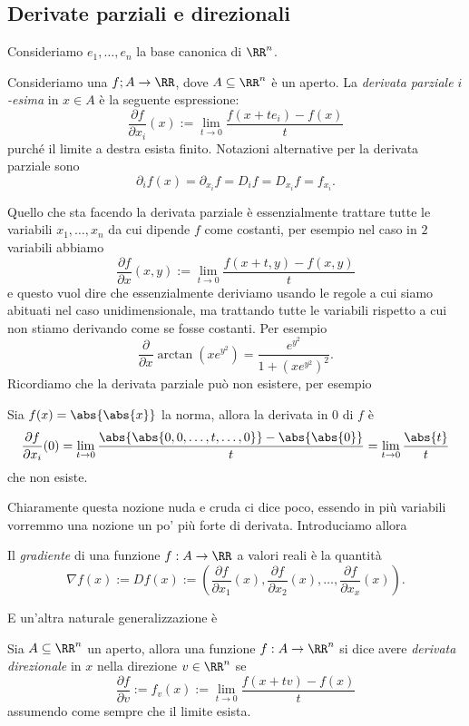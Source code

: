 \documentclass[11pt]{scrartcl}
\begin{document}
	\subsection{Derivate parziali e direzionali}
	Consideriamo $e_1,\dots,e_n$ la base canonica di $\RR^n$.
	\begin{definition}
		Consideriamo una $f;A\to \RR$, dove $A\subseteq \RR^n$ è un aperto. La \textit{derivata parziale $i$-esima} in $x\in A$ è la seguente espressione:
		$$\frac{\partial f}{\partial x_i}(x):=\lim_{t\to 0}\frac{f(x+te_i)-f(x)}{t}$$
		purché il limite a destra esista finito. Notazioni alternative per la derivata parziale sono
		$$\partial_if(x)=\partial_{x_i}f=D_if=D_{x_i}f=f_{x_i}.$$
	\end{definition}
	Quello che sta facendo la derivata parziale è essenzialmente trattare tutte le variabili $x_1,\dots,x_n$ da cui dipende $f$ come costanti, per esempio nel caso in $2$ variabili abbiamo
	$$\frac{\partial f}{\partial x}(x,y):=\lim_{t\to 0}\frac{f(x+t,y)-f(x,y)}{t}$$
	e questo vuol dire che essenzialmente deriviamo usando le regole a cui siamo abituati nel caso unidimensionale, ma trattando tutte le variabili rispetto a cui non stiamo derivando come se fosse costanti. Per esempio
	$$\frac{\partial}{\partial x}\arctan(x e^{y^2})=\frac{e^{y^2}}{1+(xe^{y^2})^2}.$$
	Ricordiamo che la derivata parziale può non esistere, per esempio
	\begin{example}
		Sia $f(x)=\abs{\abs{x}}$ la norma, allora la derivata in $0$ di $f$ è
		$$\frac{\partial f}{\partial x_i}(0)=\lim_{t\to 0}\frac{\abs{\abs{0,0,\dots,t,\dots,0}}-\abs{\abs{0}}}{t}=\lim_{t\to 0}\frac{\abs{t}}{t}$$
		che non esiste.
	\end{example}
	Chiaramente questa nozione nuda e cruda ci dice poco, essendo in più variabili vorremmo una nozione un po' più forte di derivata. Introduciamo allora
	\begin{definition}[Gradiente]
		Il \textit{gradiente} di una funzione $f:A\to\RR$ a valori reali è la quantità
		$$\nabla f(x):=Df(x):=\left(\frac{\partial f}{\partial x_1}(x),\frac{\partial f}{\partial x_2}(x),\dots, \frac{\partial f}{\partial x_x}(x)\right).$$
	\end{definition}
	E un'altra naturale generalizzazione è
	\begin{definition}
		Sia $A\subseteq \RR^n$ un aperto, allora una funzione $f:A\to\RR^n$ si dice avere \textit{derivata direzionale} in $x$ nella direzione $v\in \RR^n$ se 
		$$\frac{\partial f}{\partial v}:=f_v(x):= \lim_{t\to 0}\frac{f(x+tv)-f(x)}{t}$$
		assumendo come sempre che il limite esista.
	\end{definition}
\end{document}
